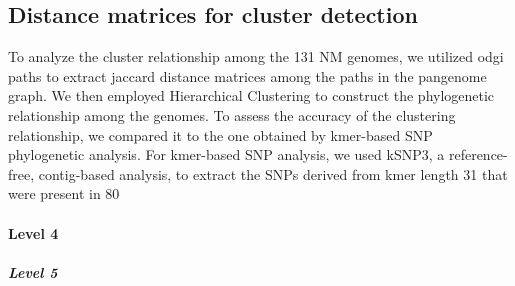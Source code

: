 \subsection{Distance matrices for cluster detection}
To analyze the cluster relationship among the 131 NM genomes, we utilized odgi paths to extract jaccard distance matrices among the paths in the pangenome graph. We then employed Hierarchical Clustering to construct the phylogenetic relationship among the genomes. To assess the accuracy of the clustering relationship, we compared it to the one obtained by kmer-based SNP phylogenetic analysis.
For kmer-based SNP analysis, we used kSNP3, a reference-free, contig-based analysis, to extract the SNPs derived from kmer length 31 that were present in 80%

\paragraph{Level 4}
\subparagraph{Level 5}
